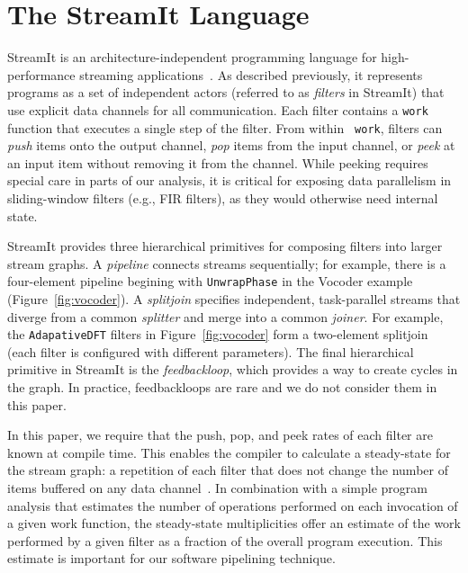 \section{The StreamIt Language}

StreamIt is an architecture-independent programming language for
high-performance streaming
applications~\cite{streamitcc,streamit-lang-spec}.  As described
previously, it represents programs as a set of independent actors
(referred to as {\it filters} in StreamIt) that use explicit data
channels for all communication.  Each filter contains a {\tt work}
function that executes a single step of the filter.  From within {\tt
work}, filters can {\it push} items onto the output channel, {\it pop}
items from the input channel, or {\it peek} at an input item without
removing it from the channel.  
While peeking requires special care in parts of our analysis, it is
critical for exposing data parallelism in sliding-window filters
(e.g., FIR filters), as they would otherwise need internal state.

StreamIt provides three hierarchical primitives for composing filters
into larger stream graphs.  A {\it pipeline} connects streams
sequentially; for example, there is a four-element pipeline begining
with {\tt UnwrapPhase} in the Vocoder example
(Figure~\ref{fig:vocoder}).  A {\it splitjoin} specifies independent,
task-parallel streams that diverge from a common {\it splitter} and
merge into a common {\it joiner}.  For example, the {\tt AdapativeDFT}
filters in Figure~\ref{fig:vocoder} form a two-element splitjoin (each
filter is configured with different parameters).  The final
hierarchical primitive in StreamIt is the {\it feedbackloop}, which
provides a way to create cycles in the graph.  In practice,
feedbackloops are rare and we do not consider them in this paper.

In this paper, we require that the push, pop, and peek rates of each
filter are known at compile time.  This enables the compiler to
calculate a steady-state for the stream graph: a repetition of each
filter that does not change the number of items buffered on any data
channel~\cite{lee-messserchmidt93staticscheduling,karczma03lctes}.  In
combination with a simple program analysis that estimates the number
of operations performed on each invocation of a given work function,
the steady-state multiplicities offer an estimate of the work
performed by a given filter as a fraction of the overall program
execution.  This estimate is important for our software pipelining
technique.
